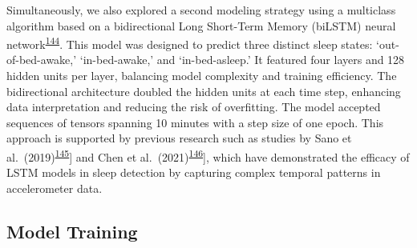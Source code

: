 \documentclass[
  10pt,
]{scrbook}
\begin{document}
Simultaneously, we also explored a second modeling strategy using a
multiclass algorithm based on a bidirectional Long Short-Term Memory
(biLSTM) neural
network\textsuperscript{\protect\hyperlink{ref-hochreiter_long_1997}{144}}.
This model was designed to predict three distinct sleep states:
`out-of-bed-awake,' `in-bed-awake,' and `in-bed-asleep.' It featured
four layers and 128 hidden units per layer, balancing model complexity
and training efficiency. The bidirectional architecture doubled the
hidden units at each time step, enhancing data interpretation and
reducing the risk of overfitting. The model accepted sequences of
tensors spanning 10 minutes with a step size of one epoch. This approach
is supported by previous research such as studies by Sano et
al.~(2019)\textsuperscript{\protect\hyperlink{ref-sano_multimodal_2019}{145}}{]}
and Chen et
al.~(2021)\textsuperscript{\protect\hyperlink{ref-chen_attention_2021}{146}}{]},
which have demonstrated the efficacy of LSTM models in sleep detection
by capturing complex temporal patterns in accelerometer data.

\hypertarget{model-training}{%
\subsection{Model Training}\label{model-training}}
\end{document}
